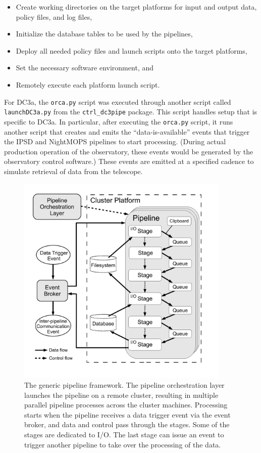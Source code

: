 \begin{itemize}
\item Create working directories on the target platforms for input and
  output data, policy files, and log files,
\item Initialize the database tables to be used by the pipelines, 
\item Deploy all needed policy files and launch scripts onto the
  target platforms,
\item Set the necessary software environment, and 
\item Remotely execute each platform launch script.
\end{itemize}

For DC3a, the \texttt{orca.py} script was executed through another
script called \texttt{launchDC3a.py} from the \texttt{ctrl\_dc3pipe}
package.  This script handles setup that is specific to DC3a.  In
particular, after executing the \texttt{orca.py} script, it runs
another script that creates and emits the ``data-is-available'' events
that trigger the IPSD and NightMOPS pipelines to start processing.
(During actual production operation of the observatory, these events
would be generated by the observatory control software.)  These events
are emitted at a specified cadence to simulate retrieval of data from
the telescope.  

\begin{figure}[t]
\begin{center}
\includegraphics[height=4.0in,bb=25 45 562 583]{images/pex.pdf}
\caption{The generic pipeline framework. The pipeline orchestration
  layer launches the pipeline on a remote cluster, resulting in
  multiple parallel pipeline processes across the cluster machines.
  Processing starts when the pipeline receives a data trigger event
  via the event broker, and data and control pass through the stages.
  Some of the stages are dedicated to I/O.  The last stage can issue
  an event to trigger another pipeline to take over the processing of
  the data.
\label{fig:pex}}
\end{center}
\end{figure}

